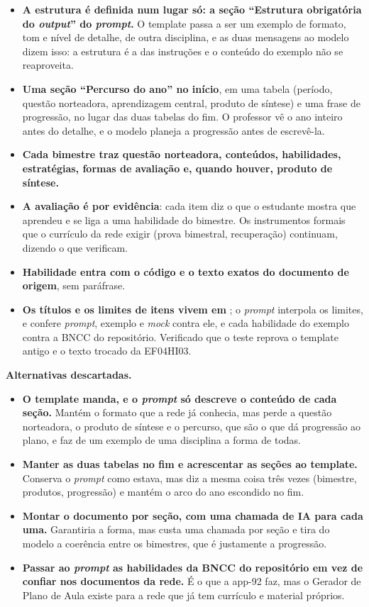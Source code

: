 \begin{itemize}
  \item \textbf{A estrutura é definida num lugar só: a seção \enquote{Estrutura
    obrigatória do \emph{output}} do \emph{prompt}.} O template passa a ser um
    exemplo de formato, tom e nível de detalhe, de outra disciplina, e as duas
    mensagens ao modelo dizem isso: a estrutura é a das instruções e o conteúdo do
    exemplo não se reaproveita.
  \item \textbf{Uma seção \enquote{Percurso do ano} no início}, em uma tabela
    (período, questão norteadora, aprendizagem central, produto de síntese) e uma
    frase de progressão, no lugar das duas tabelas do fim. O professor vê o ano
    inteiro antes do detalhe, e o modelo planeja a progressão antes de escrevê-la.
  \item \textbf{Cada bimestre traz questão norteadora, conteúdos, habilidades,
    estratégias, formas de avaliação e, quando houver, produto de síntese.}
  \item \textbf{A avaliação é por evidência}: cada item diz o que o estudante
    mostra que aprendeu e se liga a uma habilidade do bimestre. Os instrumentos
    formais que o currículo da rede exigir (prova bimestral, recuperação) continuam,
    dizendo o que verificam.
  \item \textbf{Habilidade entra com o código e o texto exatos do documento de
    origem}, sem paráfrase.
  \item \textbf{Os títulos e os limites de itens vivem em
    }; o \emph{prompt} interpola os limites, e
     confere \emph{prompt}, exemplo e
    \emph{mock} contra ele, e cada habilidade do exemplo contra a BNCC do
    repositório. Verificado que o teste reprova o template antigo e o texto
    trocado da EF04HI03.
\end{itemize}

\textbf{Alternativas descartadas.}

\begin{itemize}
  \item \textbf{O template manda, e o \emph{prompt} só descreve o conteúdo de
    cada seção.} Mantém o formato que a rede já conhecia, mas perde a questão
    norteadora, o produto de síntese e o percurso, que são o que dá progressão ao
    plano, e faz de um exemplo de uma disciplina a forma de todas.
  \item \textbf{Manter as duas tabelas no fim e acrescentar as seções ao
    template.} Conserva o \emph{prompt} como estava, mas diz a mesma coisa três
    vezes (bimestre, produtos, progressão) e mantém o arco do ano escondido no fim.
  \item \textbf{Montar o documento por seção, com uma chamada de IA para cada
    uma.} Garantiria a forma, mas custa uma chamada por seção e tira do modelo a
    coerência entre os bimestres, que é justamente a progressão.
  \item \textbf{Passar ao \emph{prompt} as habilidades da BNCC do repositório em
    vez de confiar nos documentos da rede.} É o que a app-92 faz, mas o Gerador
    de Plano de Aula existe para a rede que já tem currículo e material próprios.
\end{itemize}


